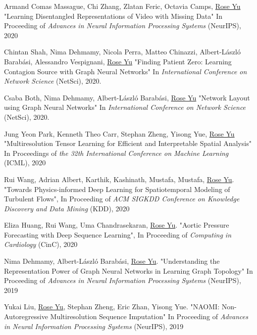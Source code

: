 \documentclass[margin,line]{res}
\begin{document}
\begin{resume}
\begin{enumerate}[label={[C\arabic*]}]
\item Armand Comas Massague, Chi Zhang, Zlatan Feric, Octavia Camps,  \underline{Rose Yu}
"Learning Disentangled Representations of Video with Missing Data"
  In  Proceeding of \textit{Advances in Neural Information Processing Systems} (NeurIPS), 2020
 
 
\item Chintan Shah, Nima Dehmamy, Nicola Perra, Matteo Chinazzi, Albert-László Barabási, Alessandro Vespignani, \underline{Rose Yu}
"Finding Patient Zero: Learning Contagion Source with Graph Neural Networks"
 In \textit{International Conference on Network Science} (NetSci),  2020. 
     
 \item Csaba Both, Nima Dehmamy,  Albert-László Barabási, \underline{Rose Yu}
"Network Layout using Graph Neural Networks"
 In \textit{International Conference on Network Science} (NetSci),  2020.  
      
\item Jung Yeon Park, Kenneth Theo Carr, Stephan Zheng, Yisong Yue, \underline{Rose Yu}
"Multiresolution Tensor Learning for Efficient and Interpretable Spatial Analysis"
 In Proceedings  of  \textit{the 32th International Conference on Machine Learning} (ICML), 2020

\item Rui Wang, Adrian Albert,  Karthik, Kashinath, Mustafa, Mustafa,  \underline{Rose Yu}. "Towards Physics-informed Deep Learning for Spatiotemporal Modeling of Turbulent Flows", In  Proceeding of\textit{ ACM SIGKDD Conference on Knowledge Discovery and Data Mining} (KDD), 2020

\item Eliza Huang, Rui Wang, Uma Chandrasekaran, \underline{Rose Yu}.  "Aortic Pressure Forecasting with Deep Sequence Learning", In  Proceeding of  \textit{Computing in Cardiology} (CinC), 2020 

\item Nima Dehmamy, Albert-L\'aszl\'o Barab\'asi, \underline{Rose Yu}.  "Understanding the Representation Power of Graph Neural Networks in Learning Graph Topology" In Proceeding of  \textit{Advances in Neural Information Processing Systems} (NeurIPS), 2019
 
 
\item  Yukai Liu, \underline{Rose Yu}, Stephan Zheng, Eric Zhan, Yisong Yue. "NAOMI: Non-Autoregressive Multiresolution Sequence Imputation" In  Proceeding of  \textit{Advances in Neural Information Processing Systems} (NeurIPS), 2019



\end{enumerate}
\end{resume}
\end{document}
